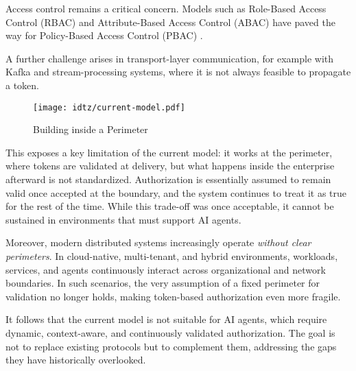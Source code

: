 \vspace{0.5em} Access control remains a critical concern. Models such as Role-Based Access Control (RBAC) and Attribute-Based Access Control (ABAC) have paved the way for Policy-Based Access Control (PBAC) \cite{c7}.  

\vspace{0.5em} A further challenge arises in transport-layer communication, for example with Kafka and stream-processing systems, where it is not always feasible to propagate a token.

\begin{figure}[htbp]
    \centering
    \texttt{[image: idtz/current-model.pdf]}
    \caption{Building inside a Perimeter}
    \label{fig:current-model}
\end{figure}

\vspace{0.5em} This exposes a key limitation of the current model: it works at the perimeter, where tokens are validated at delivery, but what happens inside the enterprise afterward is not standardized. 
Authorization is essentially assumed to remain valid once accepted at the boundary, and the system continues to treat it as true for the rest of the time.  
While this trade-off was once acceptable, it cannot be sustained in environments that must support AI agents.  

Moreover, modern distributed systems increasingly operate \emph{without clear perimeters}. 
In cloud-native, multi-tenant, and hybrid environments, workloads, services, and agents continuously interact across organizational and network boundaries. 
In such scenarios, the very assumption of a fixed perimeter for validation no longer holds, making token-based authorization even more fragile.  

It follows that the current model is not suitable for AI agents, which require dynamic, context-aware, and continuously validated authorization. 
The goal is not to replace existing protocols but to complement them, addressing the gaps they have historically overlooked.
